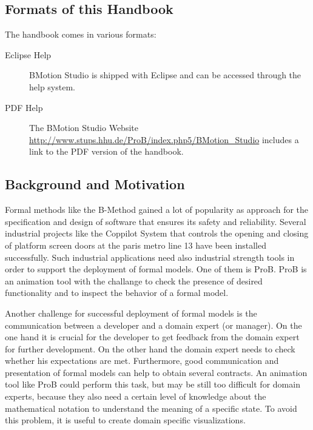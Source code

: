 \documentclass[twoside,10pt]{book}
\begin{document}
\subsection{Formats of this Handbook}

The handbook comes in various formats:

\begin{description}
	\item[Eclipse Help] BMotion Studio is shipped with Eclipse and can be accessed through the help system.
	\item[PDF Help] The BMotion Studio Website \url{http://www.stups.hhu.de/ProB/index.php5/BMotion_Studio} includes a link to the PDF version of the handbook.
\end{description}

\subsection{Background and Motivation}

Formal methods like the B-Method gained a lot of popularity as approach for the specification and design of software that ensures its safety and reliability. Several industrial projects like the Coppilot System that controls the opening and closing of platform screen doors at the paris metro line 13 have been installed successfully. Such industrial applications need also industrial strength tools in order to support the deployment of formal models. One of them is ProB. ProB is an animation tool with the challange to check the presence of desired functionality and to inspect the behavior of a formal model.

Another challenge for successful deployment of formal models is the communication between a developer and a domain expert (or manager). On the one hand it is crucial for the developer to get feedback from the domain expert for further development. On the other hand the domain expert needs to check whether his expectations are met. Furthermore, good communication and presentation of formal models can help to obtain several contracts. An animation tool like ProB could perform this task, but may be still too difficult for domain experts, because they also need a certain level of knowledge about the mathematical notation to understand the meaning of a specific state. To avoid this problem, it is useful to create domain specific visualizations.
\end{document}

